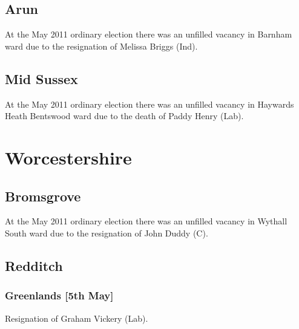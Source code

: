 \begin{resultsiii}
\subsection*{Arun}


At the May 2011 ordinary election there was an unfilled vacancy in Barnham ward due to the resignation of Melissa Briggs (Ind).

\subsection*{Mid Sussex}


At the May 2011 ordinary election there was an unfilled vacancy in Haywards Heath Bentswood ward due to the death of Paddy Henry (Lab).

\section{Worcestershire}

\subsection*{Bromsgrove}


At the May 2011 ordinary election there was an unfilled vacancy in Wythall South ward due to the resignation of John Duddy (C).

\subsection*{Redditch}

\subsubsection*{Greenlands \hspace*{\fill}\nolinebreak[1]%
\enspace\hspace*{\fill}
[5th May]}


Resignation of Graham Vickery (Lab).


\end{resultsiii}
